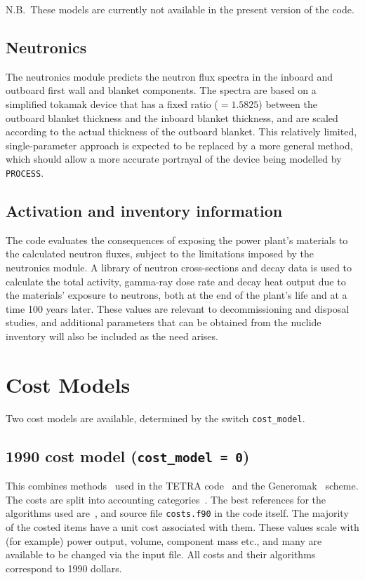\documentclass[11pt,a4paper]{report}
\newcommand{\process}{\mbox{\texttt{PROCESS}}}
\begin{document}
N.B.\ These models are currently not available in the present version of the
code.

\subsection{Neutronics}

The neutronics module predicts the neutron flux spectra in the inboard and
outboard first wall and blanket components. The spectra are based on a
simplified tokamak device that has a fixed ratio ($=1.5825$) between the
outboard blanket thickness and the inboard blanket thickness, and are scaled
according to the actual thickness of the outboard blanket. This relatively
limited, single-parameter approach is expected to be replaced by a more
general method, which should allow a more accurate portrayal of the device
being modelled by \process.

\subsection{Activation and inventory information}

The code evaluates the consequences of exposing the power plant's materials to
the calculated neutron fluxes, subject to the limitations imposed by the
neutronics module. A library of neutron cross-sections and decay data is used
to calculate the total activity, gamma-ray dose rate and decay heat output due
to the materials' exposure to neutrons, both at the end of the plant's life
and at a time 100 years later. These values are relevant to decommissioning
and disposal studies, and additional parameters that can be obtained from the
nuclide inventory will also be included as the need arises.

\section{Cost Models}

Two cost models are available, determined by the switch \texttt{cost\_model}.

\subsection{1990 cost model (\texttt{cost\_model = 0})}

This combines methods~\cite{cost1} used in the TETRA code~\cite{tetra} and the Generomak~\cite{generomak} scheme.  The
costs are split into accounting categories~\cite{cost2}. The best references for the algorithms used are~\cite{storac}, and source file \texttt{costs.f90} in the code itself. The majority of the costed items have a unit cost associated with them. These values scale with (for example) power output, volume, component mass etc., and many are available to be changed via the input file. All costs and their algorithms correspond to 1990 dollars.
\end{document}
